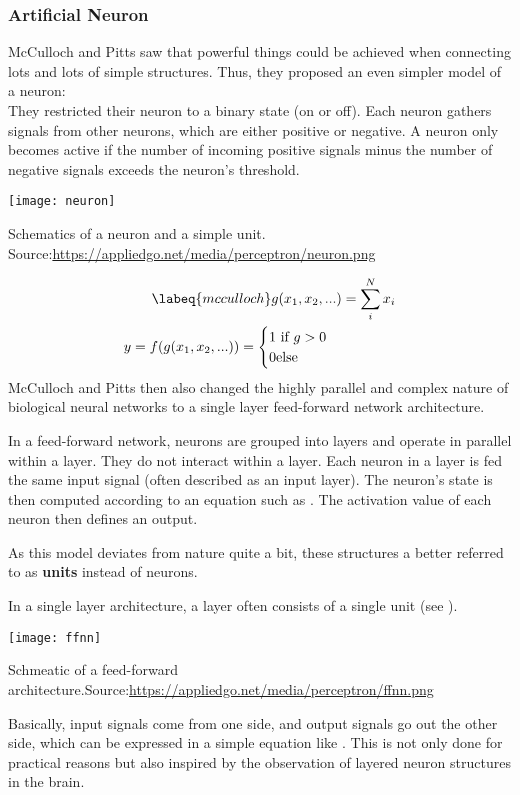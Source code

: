 \subsubsection{Artificial Neuron}
McCulloch and Pitts saw that powerful things could be achieved when connecting lots and lots of simple structures.
Thus, they proposed an even simpler model of a neuron: \\
They restricted their neuron to a binary state (on or off).
Each neuron gathers signals from other neurons, which are either positive or negative.
A neuron only becomes active if the number of incoming positive signals minus the number of negative signals exceeds the neuron's threshold.
\begin{marginfigure}
    \texttt{[image: neuron]}
    \caption[]{Schematics of a neuron and a simple unit. Source:\url{https://appliedgo.net/media/perceptron/neuron.png}}
\end{marginfigure}
\begin{align}
    \labeq{mcculloch}
    g(x_1, x_2, ...) & = \sum_i^N x_i \\
    y = f(g(x_1, x_2, ...)) = \begin{cases} 1 \text{ if } g > 0 \\ 0 \text{else} \end{cases}
\end{align}
McCulloch and Pitts then also changed the highly parallel and complex nature of biological neural networks to a single layer feed-forward network architecture.

In a feed-forward network, neurons are grouped into layers and operate in parallel within a layer.
They do not interact within a layer.
Each neuron in a layer is fed the same input signal (often described as an input layer).
The neuron's state is then computed according to an equation such as .
The activation value of each neuron then defines an output.

As this model deviates from nature quite a bit, these structures a better referred to as \textbf{units} instead of neurons.

In a single layer architecture, a layer often consists of a single unit (see ).
\begin{marginfigure}
    \texttt{[image: ffnn]}
    \caption[]{Schmeatic of a feed-forward architecture.Source:\url{https://appliedgo.net/media/perceptron/ffnn.png}}
\end{marginfigure}
Basically, input signals come from one side, and output signals go out the other side, which can be expressed in a simple equation like .
This is not only done for practical reasons but also inspired by the observation of layered neuron structures in the brain.

